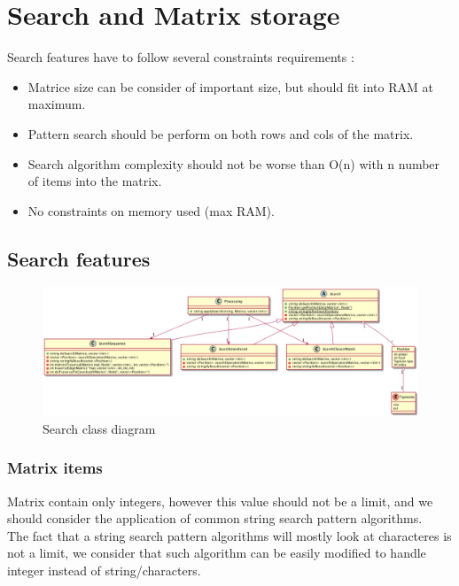 \chapter{Search and Matrix storage}

\par
Search features have to follow several constraints requirements :
\begin{itemize}
	\item Matrice size can be consider of important size, but should fit into RAM at maximum.
	\item Pattern search should be perform on both rows and cols of the matrix.
	\item Search algorithm complexity should not be worse than O(n) with n number of items into the matrix.
	\item No constraints on memory used (max RAM).
\end{itemize}

\section{Search features}

\begin{figure}[h]
    \begin{center}
        \includegraphics[scale=0.40]{./ressources/graph/processing.png}
    \end{center}
    \caption{Search class diagram}
    \label{Solution - Search class diagram}
\end{figure}
\bigskip

\subsection{Matrix items}
Matrix contain only integers, however this value should not be a limit, and we should consider the application of common string search pattern algorithms.\\
The fact that a string search pattern algorithms will mostly look at characteres is not a limit, we consider that such algorithm can be easily modified to handle integer instead of string/characters.\\

